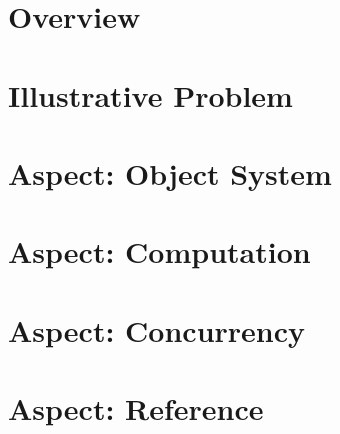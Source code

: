\section{Overview}\label{sec:cd-overview}

\section{Illustrative Problem}\label{sec:illustrative-problem}

\section{Aspect: Object System}\label{sec:object-system}

\section{Aspect: Computation}\label{sec:computation}

\section{Aspect: Concurrency}\label{sec:concurrency}

\section{Aspect: Reference}\label{sec:reference}


